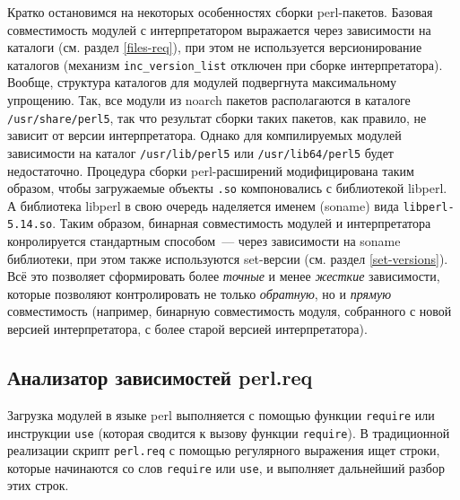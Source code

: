 \documentclass[russian,a4paper,12pt,titlepage]{article}
\begin{document}
Кратко остановимся на некоторых особенностях сборки perl-пакетов.  Базовая совместимость модулей
с интерпретатором выражается через зависимости на каталоги (см. раздел \ref{files-req}), при этом
не используется версионирование каталогов (механизм \verb|inc_version_list|
отключен при сборке интерпретатора).  Вообще, структура каталогов для модулей подвергнута максимальному упрощению.
Так, все модули из noarch пакетов располагаются в каталоге \verb|/usr/share/perl5|, так что результат
сборки таких пакетов, как правило, не зависит от версии интерпретатора.  Однако для компилируемых
модулей зависимости на каталог \verb|/usr/lib/perl5| или \verb|/usr/lib64/perl5| будет недостаточно.
Процедура сборки perl-расширений модифицирована таким образом, чтобы загружаемые объекты \verb|.so| компоновались
с библиотекой libperl.  А библиотека libperl в свою очередь наделяется именем (soname) вида \verb|libperl-5.14.so|.
Таким образом, бинарная совместимость модулей и интерпретатора конролируется стандартным способом~--- через
зависимости на soname библиотеки, при этом также используются set-версии (см. раздел \ref{set-versions}).
Всё это позволяет сформировать более \textit{точные} и менее \textit{жесткие} зависимости, которые позволяют
контролировать не только \textit{обратную}, но и \textit{прямую} совместимость (например,
бинарную совместимость модуля, собранного с новой версией интерпретатора, с более старой версией интерпретатора).

\subsection{Анализатор зависимостей perl.req}

Загрузка модулей в языке perl выполняется с помощью функции \verb|require| или
инструкции \verb|use| (которая сводится к вызову функции \verb|require|).
В традиционной реализации скрипт \verb|perl.req| с помощью регулярного
выражения ищет строки, которые начинаются со слов \verb|require| или \verb|use|,
и выполняет дальнейший разбор этих строк.
\end{document}
